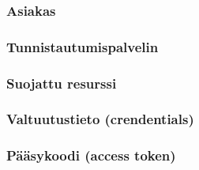 
\subsubsection{Asiakas}

\subsubsection{Tunnistautumispalvelin}

\subsubsection{Suojattu resurssi}

\subsubsection{Valtuutustieto (crendentials)}

\subsubsection{Pääsykoodi (access token)}
